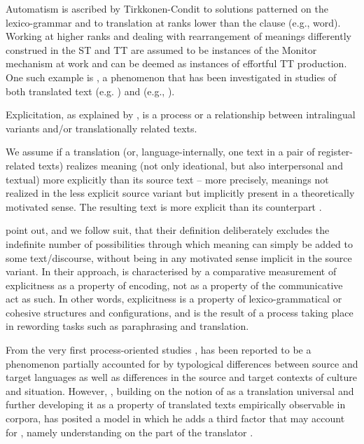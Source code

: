 \documentclass[output=paper]{LSP/langsci}
\begin{document}
Automatism is ascribed by Tirkkonen-Condit to solutions patterned on the  lexico-grammar and to translation at ranks lower than the clause (e.g., word). Working at higher ranks and dealing with rearrangement of meanings differently construed in the ST and TT are assumed to be instances of the Monitor mechanism at work \citep[409]{TirkkonenCondit2005} and can be deemed as instances of effortful TT production. One such example is , a phenomenon that has been investigated in studies of both translated text (e.g. \citealt{BlumKulka1986, Klaudy1998}) and  (e.g., \citealt{Seguinot1988, Englund1993, Englund2005, Alves2011Modeling, Carl2012Inside, Schaeffer2013The, Carl2014Word, Halverson2015}).

Explicitation, as explained by \citet{Hansen2007}, is a process or a relationship between intralingual variants and/or translationally related texts. 

We assume  if a translation (or, language-internally, one text in a pair of register-related texts) realizes meaning (not only ideational, but also interpersonal and textual) more explicitly than its source text -- more precisely, meanings not realized in the less explicit source variant but implicitly present in a theoretically motivated sense. The resulting text is more explicit than its counterpart \citep[243]{Hansen2007}.

\citet[243]{Hansen2007} point out, and we follow suit, that their definition deliberately excludes the indefinite number of possibilities through which meaning can simply be added to some text/discourse, without being in any motivated sense implicit in the source variant. In their approach,  is characterised by a comparative measurement of explicitness as a property of encoding, not as a property of the communicative act as such. In other words, explicitness is a property of lexico-grammatical or cohesive structures and configurations, and  is the result of a process taking place in rewording tasks such as paraphrasing and translation.

From the very first process-oriented studies \citep{Seguinot1988, Englund1993},  has been reported to be a phenomenon partially accounted for by typological differences between source and target languages as well as differences in the source and target contexts of culture and situation. However, \citet{Steiner2001Intralingual, Steiner2001Translations}, building on the notion of  as a translation universal \citep{Baker1995, Baker1996} and further developing it as a property of translated texts empirically observable in corpora, has posited a model in which he adds a third factor that may account for , namely understanding on the part of the translator%
%
%
%
. 
\end{document}
